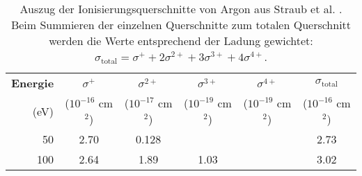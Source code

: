 \begin{table}
    \centering
    \caption[Auszug der Ionisierungsquerschnitte von Argon aus Straub et al.]{Auszug der Ionisierungsquerschnitte von Argon aus Straub et al. \cite{Straub}. Beim Summieren der einzelnen Querschnitte zum totalen Querschnitt werden die Werte entsprechend der Ladung gewichtet:
    $\sigma_{\text{total}} = \sigma^+ + 2\sigma^{2+} + 3\sigma^{3+} + 4\sigma^{4+}$.}
    \label{tab:argon}
    \begin{tabular}{r c c c c c}
        \toprule
        \textbf{Energie} & $\sigma^+$ & $\sigma^{2+}$ & $\sigma^{3+}$ & $\sigma^{4+}$ & $\sigma_{\text{total}}$ \\
        (eV) & ($10^{-16}$ cm$^2$) & ($10^{-17}$ cm$^2$) & ($10^{-19}$ cm$^2$) & ($10^{-19}$ cm$^2$) & ($10^{-16}$ cm$^2$) \\
        \midrule
        50  & 2.70   & 0.128  &        &        & 2.73   \\
        100 & 2.64   & 1.89   & 1.03   &        & 3.02   \\

\end{tabular}
\end{table}
